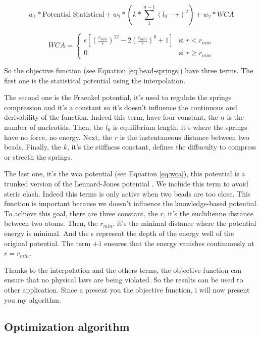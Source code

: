 \documentclass[11pt,a4paper]{article}
\begin{document}
\begin{equation}
    w_1 * \text{Potential Statistical} +  w_2 * (k * \sum_{1}^{n-1}(l_0 - r)^2) + w_2  * WCA
    \label{eq:bead-springs}
\end{equation}

\begin{equation}
    WCA = 
    \begin{cases} 
    \epsilon \left[ \left(\frac{r_{min}}{r}\right)^{12} - 2\left(\frac{r_{min}}{r}\right)^6 + 1 \right] & \text{si } r < r_{min} \\
    0 & \text{si } r \ge r_{min}
    \end{cases}
    \label{eq:wca}
\end{equation}

So the objective function (see Equation \ref{eq:bead-springs}) have three terms. The first one is the statistical potential using the interpolation. 

The second one is the Fraenkel potential, it's used to regulate the springs compression and it's a constant so it's doesn't influence the continuous and derivability of the function. Indeed this term, have four constant, the $n$ is the number of nucleotids. Then, the $l_0$ is equilibrium length, it's where the springs have no force, no energy. Next, the $r$ is the instentaneous distance between two beads. Finally, the $k$, it's the stiffness constant, defines the diffuculty to compress or strecth the springs. 

The last one, it's the \acrfull{wca} potential (see Equation \ref{eq:wca}), this potential is a trunked version of the Lennard-Jones potential \cite{lennard-jones_cohesion_1931}. We include this term to avoid steric clash. Indeed this terms is only active when two beads are too close. This function is important because we doesn't influence the knowledge-based potential. To achieve this goal, there are three constant, the $r$, it's the euclidienne distance between two atoms. Then, the $r_{min}$, it's the minimal distance where the potential energy is minimal. And the $\epsilon$ represent the depth of the energy well of the original potential. The term $+1$ ensures that the energy vanishes continuously at $r =r_{min}$. 

Thanks to the interpolation and the others terms, the objective function can ensure that no physical laws are being violated. So the results can be used to other application. Since a present you the objective function, i will now present you my algorithm. 

\subsection{Optimization algorithm}
\end{document}
